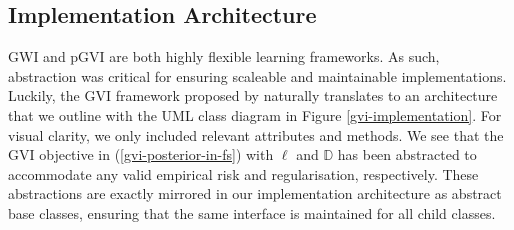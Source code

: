 \documentclass{article}
\numberwithin{equation}{section}
\begin{document}
\subsection{Implementation Architecture}\label{implementation-architecture}
GWI and pGVI are both highly flexible learning frameworks. 
As such, abstraction was critical for ensuring scaleable and maintainable implementations.
Luckily, the GVI framework proposed by \cite{knoblauch2022optimization} naturally translates to an architecture that we outline with the UML class diagram in Figure \ref{gvi-implementation}.
For visual clarity, we only included relevant attributes and methods.
We see that the GVI objective in (\ref{gvi-posterior-in-fs}) with $\ell$ and $\mathbb{D}$ has been abstracted to accommodate any valid empirical risk and regularisation, respectively.
These abstractions are exactly mirrored in our implementation architecture as abstract base classes, ensuring that the same interface is maintained for all child classes.
\end{document}
